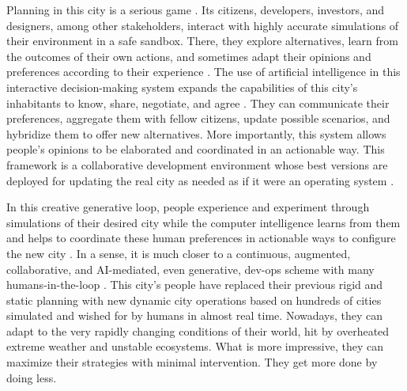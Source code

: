 Planning in this city is a serious game \citep{Beirao2012,Dodig2019}. Its citizens, developers, investors, and designers, among other stakeholders, interact with highly accurate simulations of their environment in a safe sandbox. There, they explore alternatives, learn from the outcomes of their own actions, and sometimes adapt their opinions and preferences according to their experience \citep{Burr2018}. The use of artificial intelligence in this interactive decision-making system expands the capabilities of this city’s inhabitants to know, share, negotiate, and agree \citep{Engelbart1962}. They can communicate their preferences, aggregate them with fellow citizens, update possible scenarios, and hybridize them to offer new alternatives. More importantly, this system allows people’s opinions to be elaborated and coordinated in an actionable way. This framework is a collaborative development environment whose best versions are deployed for updating the real city as needed as if it were an operating system \citep{Marvin2017}.

In this creative generative loop, people experience and experiment through simulations of their desired city while the computer intelligence learns from them and helps to coordinate these human preferences in actionable ways to configure the new city \citep{Konig2017}. In a sense, it is much closer to a continuous, augmented, collaborative, and AI-mediated, even generative, dev-ops scheme with many humans-in-the-loop \citep{Chirkin2016,Scott2002,Veloso2021}. This city’s people have replaced their previous rigid and static planning with new dynamic city operations based on hundreds of cities simulated and wished for by humans in almost real time. Nowadays, they can adapt to the very rapidly changing conditions of their world, hit by overheated extreme weather and unstable ecosystems. What is more impressive, they can maximize their strategies with minimal intervention. They get more done by doing less.

